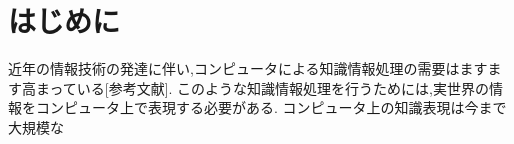 \chapter{はじめに}
近年の情報技術の発達に伴い,コンピュータによる知識情報処理の需要はますます高まっている[参考文献].
このような知識情報処理を行うためには,実世界の情報をコンピュータ上で表現する必要がある.
コンピュータ上の知識表現は今まで大規模な